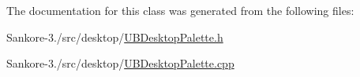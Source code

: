 The documentation for this class was generated from the following files\-:\begin{DoxyCompactItemize}
\item 
Sankore-\/3./src/desktop/\hyperlink{_u_b_desktop_palette_8h}{U\-B\-Desktop\-Palette.\-h}\item 
Sankore-\/3./src/desktop/\hyperlink{_u_b_desktop_palette_8cpp}{U\-B\-Desktop\-Palette.\-cpp}\end{DoxyCompactItemize}
